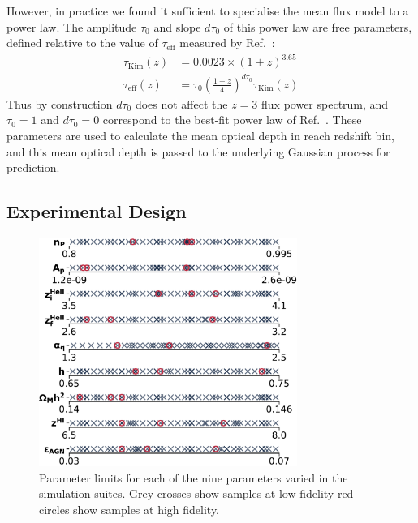 \documentclass[a4paper,11pt]{article}
\begin{document}
However, in practice we found it sufficient to specialise the mean flux model to a power law. The amplitude $\tau_0$ and slope $d\tau_0$ of this power law are free parameters, defined relative to the value of $\tau_\mathrm{eff}$ measured by Ref.~\cite{Kim:2007}:
\begin{align}
\tau_\mathrm{Kim}(z) &= 0.0023 \times (1 + z)^{3.65} \\
 \tau_\mathrm{eff}(z) &= \tau_0 \left(\frac{1+z}{4}\right)^{d\tau_0}  \tau_\mathrm{Kim}(z)
 \label{eq:meanflux}
\end{align}
Thus by construction $d\tau_0$ does not affect the $z=3$ flux power spectrum, and $\tau_0 = 1$ and $d\tau_0 = 0$ correspond to the best-fit power law of Ref.~\cite{Kim:2007}. These parameters are used to calculate the mean optical depth in reach redshift bin, and this mean optical depth is passed to the underlying Gaussian process for prediction.


\subsection{Experimental Design}
\label{sec:latinhypercube}

\begin{figure}
    \centering
    \includegraphics[width=0.75\textwidth]{figures/sample_params.pdf}
    \caption{\label{fig:samples}
    Parameter limits for each of the nine parameters varied in the simulation suites.
    Grey crosses show samples at low fidelity  red circles show samples at high fidelity.
    }
\end{figure}
\end{document}

